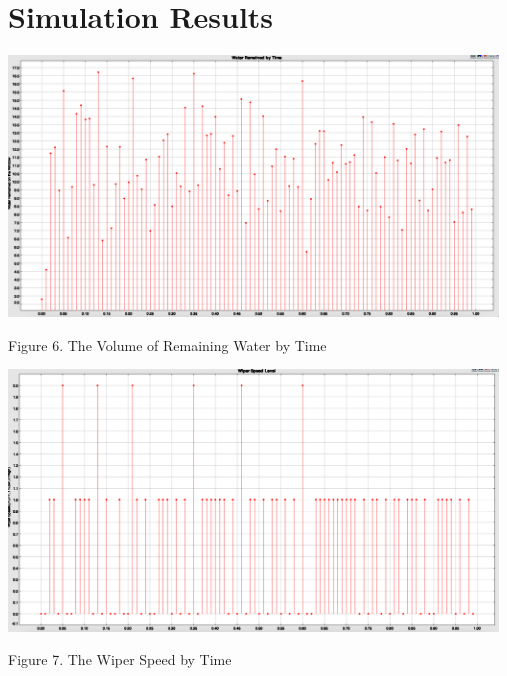 \section{Simulation Results}
\begin{center}
\includegraphics[width=13cm]{fig6.png}
\end{center}
\begin{center}
\small{Figure 6. The Volume of Remaining Water by Time}
\end{center}
\begin{center}
\includegraphics[width=13cm]{fig7.png}
\end{center}
\begin{center}
\small{Figure 7. The Wiper Speed by Time}
\end{center}